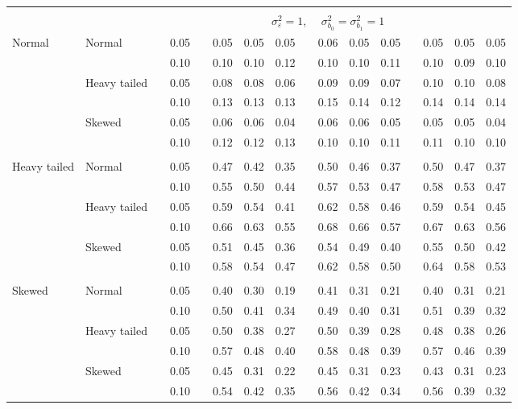 \documentclass[12pt]{article} %
\begin{document}
\begin{table}[ht]
\begin{scriptsize}
\begin{center}
\begin{tabular}{ll p{.1cm} c p{.1cm} rrr p{.1cm} rrr p{.1cm} rrr}
&&&&&&&&&&&&&&&\\
& && && \multicolumn{9}{c}{$\sigma_{\varepsilon}^2 = 1$, \ \ $\sigma_{b_0}^2 = \sigma_{b_1}^2 = 1$} \\ \cline{6-16}
\rowcolor{gray!20}Normal       & Normal       && 0.05 &&   0.05 & 0.05 & 0.05 && 0.06 & 0.05 & 0.05 &&  0.05 & 0.05 & 0.05 \\
\rowcolor{gray!20}             &              && 0.10 &&   0.10 & 0.10 & 0.12 && 0.10 & 0.10 & 0.11 &&  0.10 & 0.09 & 0.10 \\
\rowcolor{gray!20}             & Heavy tailed && 0.05 &&   0.08 & 0.08 & 0.06 && 0.09 & 0.09 & 0.07 &&  0.10 & 0.10 & 0.08 \\
\rowcolor{gray!20}             &              && 0.10 &&   0.13 & 0.13 & 0.13 && 0.15 & 0.14 & 0.12 &&  0.14 & 0.14 & 0.14 \\
\rowcolor{gray!20}             & Skewed       && 0.05 &&   0.06 & 0.06 & 0.04 && 0.06 & 0.06 & 0.05 &&  0.05 & 0.05 & 0.04 \\
\rowcolor{gray!20}             &              && 0.10 &&   0.12 & 0.12 & 0.13 && 0.10 & 0.10 & 0.11 &&  0.11 & 0.10 & 0.10 \\
             &&&&&&&&&&&&&&&\\
Heavy tailed & Normal       && 0.05 &&   0.47 & 0.42 & 0.35 && 0.50 & 0.46 & 0.37 && 0.50 & 0.47 & 0.37 \\
             &              && 0.10 &&   0.55 & 0.50 & 0.44 && 0.57 & 0.53 & 0.47 && 0.58 & 0.53 & 0.47 \\
             & Heavy tailed && 0.05 &&   0.59 & 0.54 & 0.41 && 0.62 & 0.58 & 0.46 && 0.59 & 0.54 & 0.45 \\
             &              && 0.10 &&   0.66 & 0.63 & 0.55 && 0.68 & 0.66 & 0.57 && 0.67 & 0.63 & 0.56 \\
             & Skewed       && 0.05 &&   0.51 & 0.45 & 0.36 && 0.54 & 0.49 & 0.40 && 0.55 & 0.50 & 0.42 \\
             &              && 0.10 &&   0.58 & 0.54 & 0.47 && 0.62 & 0.58 & 0.50 && 0.64 & 0.58 & 0.53 \\
             &&&&&&&&&&&&&&&\\
Skewed       & Normal       && 0.05 &&   0.40 & 0.30 & 0.19 && 0.41 & 0.31 & 0.21 &&  0.40 & 0.31 & 0.21 \\
             &              && 0.10 &&   0.50 & 0.41 & 0.34 && 0.49 & 0.40 & 0.31 &&  0.51 & 0.39 & 0.32 \\
             & Heavy tailed && 0.05 &&   0.50 & 0.38 & 0.27 && 0.50 & 0.39 & 0.28 &&  0.48 & 0.38 & 0.26 \\
             &              && 0.10 &&   0.57 & 0.48 & 0.40 && 0.58 & 0.48 & 0.39 &&  0.57 & 0.46 & 0.39 \\
             & Skewed       && 0.05 &&   0.45 & 0.31 & 0.22 && 0.45 & 0.31 & 0.23 &&  0.43 & 0.31 & 0.23 \\
             &              && 0.10 &&   0.54 & 0.42 & 0.35 && 0.56 & 0.42 & 0.34 &&  0.56 & 0.39 & 0.32 \\




\end{tabular}
\end{center}
\end{scriptsize}
\end{table}
\end{document}
